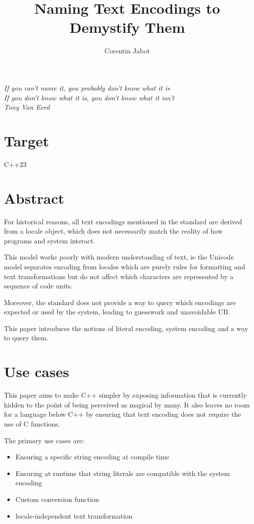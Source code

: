 \documentclass{wg21}
\title{Naming Text Encodings to Demystify Them}
\author{Corentin Jabot}{corentin.jabot@gmail.com}
\begin{document}
\maketitle

\begin{flushright}
    \hfill \break
    \hfill \break
    \textit{If you can't name it, you probably don't know what it is\\
    	If you don't know what it is, you don't know what it isn't\\
    	Tony Van Eerd}
\end{flushright}


\section{Target}

C++23

\section{Abstract}

For historical reasons, all text encodings mentioned in the standard are derived from
a locale object, which does not necessarily match the reality of how programs and system interact.

This model works poorly with modern understanding of text, ie the Unicode model separates encoding
from locales which are purely rules for formatting and text transformations but do not affect
which characters are represented by a sequence of code units.

Moreover, the standard does not provide a way to query which encodings are expected or used by the system,
leading to guesswork and unavoidable UB.

This paper introduces the notions of literal encoding, system encoding and a way to query them.

\section{Use cases}

This paper aims to make C++ simpler by exposing information that is currently hidden to the point of
being perceived as magical by many.
It also leaves no room for a language below C++ by ensuring that text encoding does not require the use of C functions.

The primary use cases are:

\begin{itemize}
    \item Ensuring a specific string encoding at compile time
    \item Ensuring at runtime that string literals are compatible with the system encoding
    \item Custom conversion function
    \item locale-independent text transformation
\end{itemize}
\end{document}
